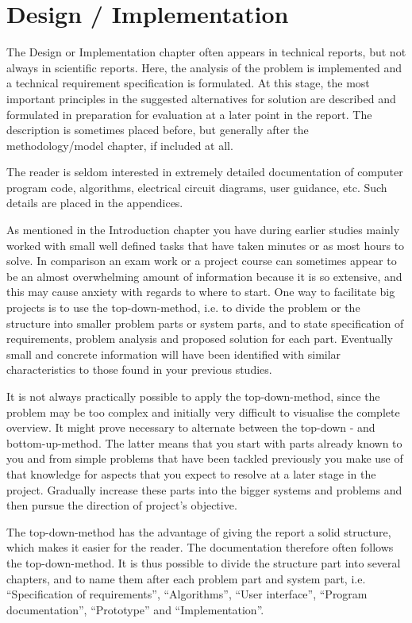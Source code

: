 \section{Design / Implementation}
\label{ch:impl}
\noindent	
The Design or Implementation chapter often appears in technical reports, but not always in scientific reports. Here, the analysis of the problem is implemented and a technical requirement specification is formulated. At this stage, the most important principles in the suggested alternatives for solution are described and formulated in preparation for evaluation at a later point in the report. The description is sometimes placed before, but generally after the methodology/model chapter, if included at all.

The reader is seldom interested in extremely detailed documentation of computer program code, algorithms, electrical circuit diagrams, user guidance, etc. Such details are placed in the appendices.

As mentioned in the Introduction chapter you have during earlier studies mainly worked with small well defined tasks that have taken minutes or as most hours to solve. In comparison an exam work or a project course can sometimes appear to be an almost overwhelming amount of information because it is so extensive, and this may cause anxiety with regards to where to start. One way to facilitate big projects is to use the top-down-method, i.e. to divide the problem or the structure into smaller problem parts or system parts, and to state specification of  requirements, problem analysis and proposed solution for each part. Eventually small and concrete information will have been identified with similar characteristics to those found in your previous studies.

It is not always practically possible to apply the top-down-method, since the problem may be too complex and initially very difficult to visualise the complete overview. It might prove necessary to alternate between the top-down - and bottom-up-method. The latter means that you start with parts already known to you and from simple problems that have been tackled previously you  make use of that knowledge for aspects that you expect to resolve at a later stage in the project. Gradually increase these parts into the bigger systems and problems and then pursue the direction of project's objective.

The top-down-method has the advantage of giving the report a solid structure, which makes it easier for the reader. The documentation therefore often follows the top-down-method. It is thus possible to divide the structure part into several chapters, and to name them after each problem part and system part, i.e. “Specification of requirements”, “Algorithms”, “User interface”, “Program documentation”, “Prototype” and “Implementation”.
